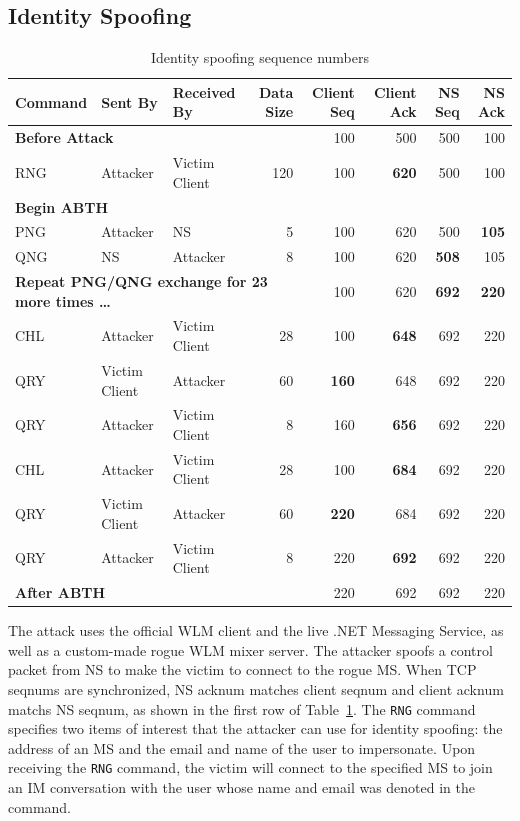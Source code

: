\documentclass{sig-alternate}
\begin{document}
\subsection{Identity Spoofing}

\begin{table}[tbp]
	\centering

	\caption{Identity spoofing sequence numbers}
	\label{tab:identityspoof}

	\begin{tabular}{l l l r r r r r}
		\hline
		\hline
		\textbf{Command} & \textbf{Sent By} & \textbf{Received By} & \textbf{Data Size} & \textbf{Client Seq} & \textbf{Client Ack} & \textbf{NS Seq} & \textbf{NS Ack} \\
		\hline
		\multicolumn{4}{l}{\textbf{Before Attack}} & 100 & 500 & 500 & 100 \\
		RNG & Attacker & Victim Client & 120 & 100 & \textbf{620} & 500 & 100 \\
		\multicolumn{8}{l}{\textbf{Begin ABTH}} \\
		PNG & Attacker & NS & 5 & 100 & 620 & 500 & \textbf{105} \\
		QNG & NS & Attacker & 8 & 100 & 620 & \textbf{508} & 105 \\
		\multicolumn{4}{l}{\textbf{Repeat PNG/QNG exchange for 23 more times \dots}} & 100 & 620 & \textbf{692} & \textbf{220} \\
		CHL & Attacker & Victim Client & 28 & 100 & \textbf{648} & 692 & 220 \\
		QRY & Victim Client & Attacker & 60 & \textbf{160} & 648 & 692 & 220 \\
		QRY & Attacker & Victim Client & 8 & 160 & \textbf{656} & 692 & 220 \\
		CHL & Attacker & Victim Client & 28 & 100 & \textbf{684} & 692 & 220 \\
		QRY & Victim Client & Attacker & 60 & \textbf{220} & 684 & 692 & 220 \\
		QRY & Attacker & Victim Client & 8 & 220 & \textbf{692} & 692 & 220 \\
		\hline
		\hline
		\multicolumn{4}{l}{\textbf{After ABTH}} & 220 & 692 & 692 & 220 \\
	\end{tabular}
\end{table}

The attack uses the official WLM client and the live .NET Messaging Service, as well as a custom-made rogue WLM mixer server. 
The attacker spoofs a control packet from NS to make the victim to connect to the rogue MS.
When TCP seqnums are synchronized, NS acknum matches client seqnum and client acknum matchs NS seqnum, as shown in the first row of Table~\ref{tab:identityspoof}.
The \texttt{RNG} command specifies two items of interest that the attacker can use for identity spoofing: the address of an MS and the email and name of the user to impersonate.
Upon receiving the \texttt{RNG} command, the victim will connect to the specified MS to join an IM conversation with the user whose name and email was denoted in the command.
\end{document}
